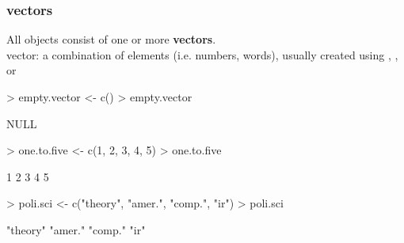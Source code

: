 \documentclass[handout]{beamer}
\newcommand{\red}{\color{red}}
\newcommand{\black}{\color{black}}
\begin{document}

\begin{frame}[fragile]
\frametitle{vectors}
All objects consist of one or more \textbf{vectors}. \\
\pause
\bigskip
vector: a combination of elements (i.e. numbers, words), usually created using \red{\tt c()}\black, \red{\tt seq()}\black, or \red{\tt rep()}\black
\end{frame}

\begin{frame}[fragile]
\red
\begin{Schunk}
\begin{Sinput}
> empty.vector <- c()
> empty.vector
\end{Sinput}
\begin{Soutput}
NULL
\end{Soutput}
\end{Schunk}
\pause
\bigskip
\begin{Schunk}
\begin{Sinput}
> one.to.five <- c(1, 2, 3, 4, 5)
> one.to.five
\end{Sinput}
\begin{Soutput}
[1] 1 2 3 4 5
\end{Soutput}
\end{Schunk}
\pause
\bigskip
\begin{Schunk}
\begin{Sinput}
> poli.sci <- c("theory", "amer.", "comp.", "ir")
> poli.sci
\end{Sinput}
\begin{Soutput}
[1] "theory" "amer."  "comp."  "ir"    
\end{Soutput}
\end{Schunk}
\end{frame}
\end{document}
